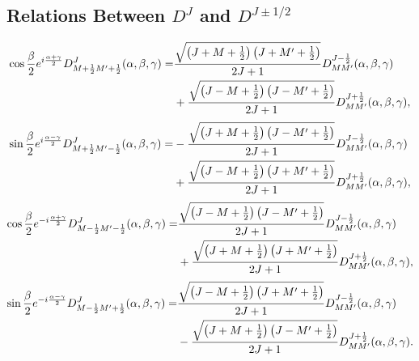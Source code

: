 \subsection{Relations Between $D^{J}$ and $D^{J \pm 1 / 2}$}\label{sec:4.8.2}
\begin{align}
\cos \frac{\beta}{2} e^{i \frac{\alpha+\gamma}{2}} D_{M+\frac{1}{2} M^{\prime}+\frac{1}{2}}^{J}(\alpha, \beta, \gamma)= & \frac{\sqrt{\left(J+M+\frac{1}{2}\right)\left(J+M^{\prime}+\frac{1}{2}\right)}}{2 J+1} D_{M M^{\prime}}^{J-\frac{1}{2}}(\alpha, \beta, \gamma)  \notag\\
& +\frac{\sqrt{\left(J-M+\frac{1}{2}\right)\left(J-M^{\prime}+\frac{1}{2}\right)}}{2 J+1} D_{M M^{\prime}}^{J+\frac{1}{2}}(\alpha, \beta, \gamma),  \label{eq:4:8:10}
\end{align}\begin{align}
\sin \frac{\beta}{2} e^{i \frac{\alpha-\gamma}{2}} D_{M+\frac{1}{2} M^{\prime}-\frac{1}{2}}^{J}(\alpha, \beta, \gamma)= & -\frac{\sqrt{\left(J+M+\frac{1}{2}\right)\left(J-M^{\prime}+\frac{1}{2}\right)}}{2 J+1} D_{M M^{\prime}}^{J-\frac{1}{2}}(\alpha, \beta, \gamma)  \notag\\
& +\frac{\sqrt{\left(J-M+\frac{1}{2}\right)\left(J+M^{\prime}+\frac{1}{2}\right)}}{2 J+1} D_{M M^{\prime}}^{J+\frac{1}{2}}(\alpha, \beta, \gamma),  \label{eq:4:8:11}
\end{align}\begin{align}
\cos \frac{\beta}{2} e^{-i \frac{\alpha+\gamma}{2}} D_{M-\frac{1}{2} M^{\prime}-\frac{1}{2}}^{J}(\alpha, \beta, \gamma)= & \frac{\sqrt{\left(J-M+\frac{1}{2}\right)\left(J-M^{\prime}+\frac{1}{2}\right)}}{2 J+1} D_{M M^{\prime}}^{J-\frac{1}{2}}(\alpha, \beta, \gamma)  \notag\\
& +\frac{\sqrt{\left(J+M+\frac{1}{2}\right)\left(J+M^{\prime}+\frac{1}{2}\right)}}{2 J+1} D_{M M^{\prime}}^{J+\frac{1}{2}}(\alpha, \beta, \gamma),  \label{eq:4:8:12}
\end{align}\begin{align}
\sin \frac{\beta}{2} e^{-i \frac{\alpha-\gamma}{2}} D_{M-\frac{1}{2} M^{\prime}+\frac{1}{2}}^{J}(\alpha, \beta, \gamma)= & \frac{\sqrt{\left(J-M+\frac{1}{2}\right)\left(J+M^{\prime}+\frac{1}{2}\right)}}{2 J+1} D_{M M^{\prime}}^{J-\frac{1}{2}}(\alpha, \beta, \gamma)  \notag\\
& -\frac{\sqrt{\left(J+M+\frac{1}{2}\right)\left(J-M^{\prime}+\frac{1}{2}\right)}}{2 J+1} D_{M M^{\prime}}^{J+\frac{1}{2}}(\alpha, \beta, \gamma) . \label{eq:4:8:13}
\end{align}
